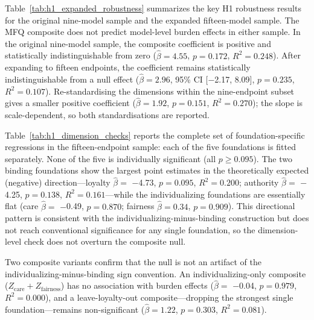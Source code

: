 \documentclass[11pt]{article}
\begin{document}
Table~\ref{tab:h1_expanded_robustness} summarizes the key H1 robustness results for the original nine-model sample and the expanded fifteen-model sample. The MFQ composite does not predict model-level burden effects in either sample. In the original nine-model sample, the composite coefficient is positive and statistically indistinguishable from zero ($\hat{\beta}=4.55$, $p=0.172$, $R^2=0.248$). After expanding to fifteen endpoints, the coefficient remains statistically indistinguishable from a null effect ($\hat{\beta}=2.96$, 95\% CI [$-$2.17, 8.09], $p=0.235$, $R^2=0.107$). Re-standardising the dimensions within the nine-endpoint subset gives a smaller positive coefficient ($\hat{\beta}=1.92$, $p=0.151$, $R^2=0.270$); the slope is scale-dependent, so both standardisations are reported.

Table~\ref{tab:h1_dimension_checks} reports the complete set of foundation-specific regressions in the fifteen-endpoint sample: each of the five foundations is fitted separately. None of the five is individually significant (all $p \geq 0.095$). The two binding foundations show the largest point estimates in the theoretically expected (negative) direction---loyalty $\hat{\beta}=$ $-$4.73, $p=0.095$, $R^2=0.200$; authority $\hat{\beta}=$ $-$4.25, $p=0.138$, $R^2=0.161$---while the individualizing foundations are essentially flat (care $\hat{\beta}=$ $-$0.49, $p=0.870$; fairness $\hat{\beta}=0.34$, $p=0.909$). This directional pattern is consistent with the individualizing-minus-binding construction but does not reach conventional significance for any single foundation, so the dimension-level check does not overturn the composite null.

Two composite variants confirm that the null is not an artifact of the individualizing-minus-binding sign convention. An individualizing-only composite ($Z_{\mathrm{care}} + Z_{\mathrm{fairness}}$) has no association with burden effects ($\hat{\beta}=$ $-$0.04, $p=0.979$, $R^2=0.000$), and a leave-loyalty-out composite---dropping the strongest single foundation---remains non-significant ($\hat{\beta}=1.22$, $p=0.303$, $R^2=0.081$).
\end{document}
